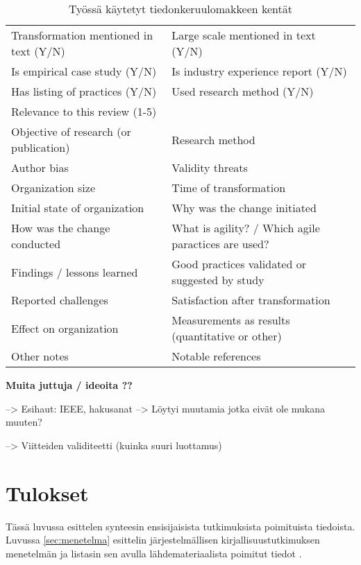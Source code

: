 \begin{table}
    \begin{tabular}{|l|l|}
        \hline
        Transformation mentioned in text (Y/N) &
        Large scale mentioned in text (Y/N) \\
        Is empirical case study (Y/N) &
        Is industry experience report (Y/N) \\
        Has listing of practices (Y/N) &
        Used research method (Y/N) \\
        Relevance to this review (1-5) & \\
        Objective of research (or publication) &
        Research method \\
        Author bias &
        Validity threats \\
        Organization size &
        Time of transformation \\
        Initial state of organization &
        Why was the change initiated \\
        How was the change conducted &
        What is agility? / Which agile paractices are used? \\
        Findings / lessons learned &
        Good practices validated or suggested by study \\
        Reported challenges &
        Satisfaction after transformation \\
        Effect on organization &
        Measurements as results (quantitative or other) \\
        Other notes &
        Notable references \\
        \hline
    \end{tabular}
    \caption{Työssä käytetyt tiedonkeruulomakkeen kentät}
    \label{table:dataform}
\end{table}


\vspace{1cm}
\textbf{Muita juttuja / ideoita ??}

--> Esihaut: IEEE, hakusanat --> Löytyi muutamia jotka eivät ole mukana muuten?

--> Viitteiden validiteetti (kuinka suuri luottamus)


\section{Tulokset}
\label{sec:tulokset}

Tässä luvussa esittelen synteesin ensisijaisista tutkimuksista poimituista
tiedoista. Luvussa \ref{sec:menetelma} esittelin järjestelmällisen
kirjallisuustutkimuksen menetelmän ja listasin sen avulla lähdemateriaalista
poimitut tiedot \citep{Kitchenham2007}.

